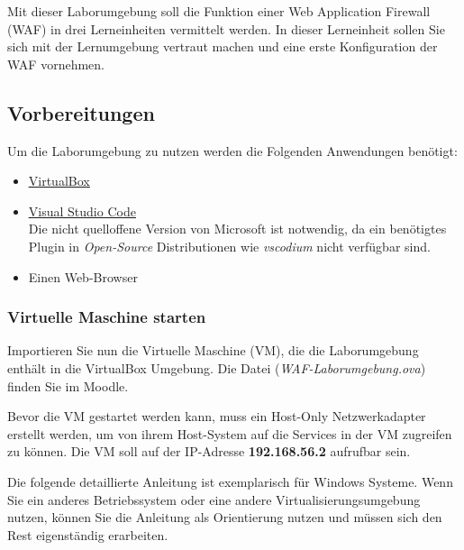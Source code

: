 Mit dieser Laborumgebung soll die Funktion einer Web Application Firewall (WAF) in drei Lerneinheiten vermittelt werden.
In dieser Lerneinheit sollen Sie sich mit der Lernumgebung vertraut machen und eine erste Konfiguration der WAF vornehmen.

\subsection{Vorbereitungen}

Um die Laborumgebung zu nutzen werden die Folgenden Anwendungen benötigt:
\begin{itemize}
    \item \href{https://www.virtualbox.org/}{\underline{VirtualBox}}
    \item \href{https://code.visualstudio.com/download}{\underline{Visual Studio Code}}\\
    Die nicht quelloffene Version von Microsoft ist notwendig, da ein benötigtes Plugin in \textit{Open-Source} Distributionen wie \textit{vscodium} nicht verfügbar sind.
    \item Einen Web-Browser
\end{itemize}

\subsubsection{Virtuelle Maschine starten}
Importieren Sie nun die Virtuelle Maschine (VM),  die die Laborumgebung enthält in die VirtualBox Umgebung.
Die Datei (\textit{WAF-Laborumgebung.ova}) finden Sie im Moodle.

Bevor die VM gestartet werden kann, muss ein Host-Only Netzwerkadapter erstellt werden, um von ihrem Host-System auf die Services in der VM zugreifen zu können.
Die VM soll auf der IP-Adresse \textbf{192.168.56.2} aufrufbar sein.

Die folgende detaillierte Anleitung ist exemplarisch für Windows Systeme.
Wenn Sie ein anderes Betriebssystem oder eine andere Virtualisierungsumgebung nutzen, können Sie die Anleitung als Orientierung nutzen und müssen sich den Rest eigenständig erarbeiten.

